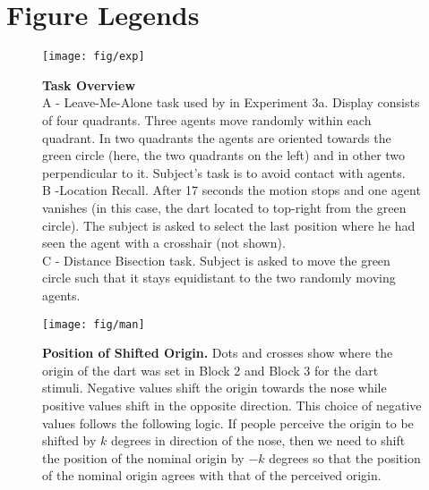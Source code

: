 \documentclass[10pt]{article}
\begin{document}


\section*{Figure Legends}
\begin{figure}[!ht]
\begin{center}
\texttt{[image: fig/exp]}
\end{center}
\caption{
{\bf Task Overview}\\
A - Leave-Me-Alone task used by \cite{gao10} in Experiment 3a. 
Display consists of four quadrants. 
Three agents move randomly within each quadrant. 
In two quadrants the agents are oriented towards the green circle (here, the two quadrants on the left) and in other two perpendicular to it. 
Subject's task is to avoid contact with agents. \\
B -Location Recall. 
After 17 seconds the motion stops and one agent vanishes (in this case, the dart located to top-right from the green circle). 
The subject is asked to select the last position where he had seen the agent with a crosshair (not shown).\\ 
C - Distance Bisection task. 
Subject is asked to move the green circle such that it stays equidistant to the two randomly moving agents. 
}
\label{fig:exp}
\end{figure}

\begin{figure}[!ht]
\begin{center}
\texttt{[image: fig/man]}
\end{center}
\caption{
{\bf Position of Shifted Origin.}
Dots and crosses show where the origin of the dart was set in Block 2 and Block 3 for the dart stimuli. 
Negative values shift the origin towards the nose while positive values shift in the opposite direction.
This choice of negative values follows the following logic. 
If people perceive the origin to be shifted by $k$ degrees in direction of the nose, then we need to shift the position of the nominal origin by $-k$ degrees so that the position of the nominal origin agrees with that of the perceived origin. 
}
\label{fig:man}
\end{figure}
\end{document}
